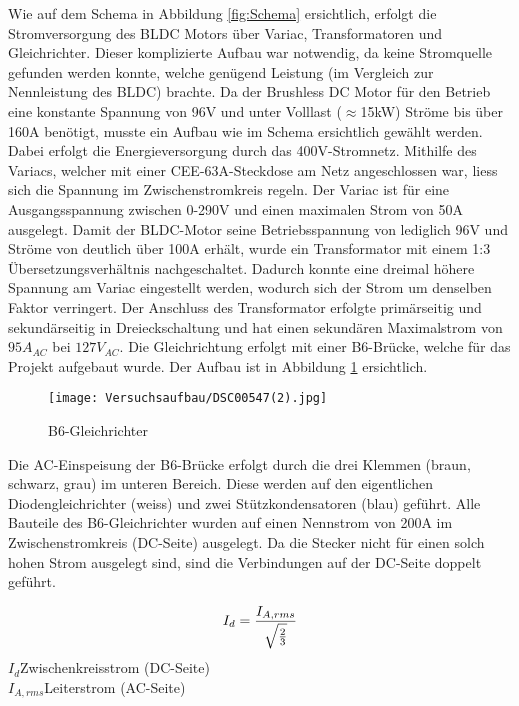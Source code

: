 Wie auf dem Schema in Abbildung \ref{fig:Schema} ersichtlich, erfolgt die Stromversorgung des BLDC Motors über Variac, Transformatoren und Gleichrichter. Dieser \glqq komplizierte \grqq Aufbau war notwendig, da keine Stromquelle gefunden werden konnte, welche genügend Leistung (im Vergleich zur Nennleistung des BLDC) brachte. Da der Brushless DC Motor für den Betrieb eine konstante Spannung von 96V und unter Volllast ($\approx$15kW) Ströme bis über 160A benötigt, musste ein Aufbau wie im Schema ersichtlich gewählt werden. Dabei erfolgt die Energieversorgung durch das 400V-Stromnetz. Mithilfe des Variacs, welcher mit einer CEE-63A-Steckdose am Netz angeschlossen war, liess sich die Spannung im Zwischenstromkreis regeln. Der Variac ist für eine Ausgangsspannung zwischen 0-290V und einen maximalen Strom von 50A ausgelegt. Damit der BLDC-Motor seine Betriebsspannung von lediglich 96V und Ströme von deutlich über 100A erhält, wurde ein Transformator mit einem 1:3 Übersetzungsverhältnis nachgeschaltet. Dadurch konnte eine dreimal höhere Spannung am Variac eingestellt werden, wodurch sich der Strom um denselben Faktor verringert. Der Anschluss des Transformator erfolgte primärseitig und sekundärseitig in Dreieckschaltung und hat einen sekundären Maximalstrom von $95A_{AC}$ bei $127V_{AC}$. Die Gleichrichtung erfolgt mit einer B6-Brücke, welche für das Projekt aufgebaut wurde. Der Aufbau ist in Abbildung \ref{fig:B6} ersichtlich.

\begin{figure}[H]
	\centering
	\texttt{[image: Versuchsaufbau/DSC00547(2).jpg]}
	\caption[B6-Gleichrichter]{B6-Gleichrichter}
	\label{fig:B6}
\end{figure}

Die AC-Einspeisung der B6-Brücke erfolgt durch die drei Klemmen (braun, schwarz, grau) im unteren Bereich. Diese werden auf den eigentlichen Diodengleichrichter (weiss) und zwei Stützkondensatoren (blau) geführt. Alle Bauteile des B6-Gleichrichter wurden auf einen Nennstrom von 200A im Zwischenstromkreis (DC-Seite) ausgelegt. Da die Stecker nicht für einen solch hohen Strom ausgelegt sind, sind die Verbindungen auf der DC-Seite doppelt geführt.

\begin{equation}
\centering
I_{d}=\frac{I_{A,rms}}{\sqrt{\frac{2}{3}}}
\label{eq:B6-Strom}
\end{equation}
$ I_{d} $\qquad\quad 	Zwischenkreisstrom (DC-Seite)      \\
$ I_{A,rms} $\quad Leiterstrom (AC-Seite)    \\

